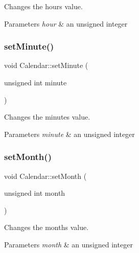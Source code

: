 Changes the hour\textquotesingle{}s value. 


\begin{DoxyParams}{Parameters}
{\em hour} & an unsigned integer \\
\hline
\end{DoxyParams}
\mbox{\label{class_calendar_a94365aea1df3a5085054d61bfa893e41}} 
\subsubsection{\texorpdfstring{set\+Minute()}{setMinute()}}
{\footnotesize\ttfamily void Calendar\+::set\+Minute (\begin{DoxyParamCaption}\item[{unsigned int}]{minute }\end{DoxyParamCaption})}



Changes the minute\textquotesingle{}s value. 


\begin{DoxyParams}{Parameters}
{\em minute} & an unsigned integer \\
\hline
\end{DoxyParams}
\mbox{\label{class_calendar_a66115274b1543b8a393d4cd92195e746}} 
\subsubsection{\texorpdfstring{set\+Month()}{setMonth()}}
{\footnotesize\ttfamily void Calendar\+::set\+Month (\begin{DoxyParamCaption}\item[{unsigned int}]{month }\end{DoxyParamCaption})}



Changes the month\textquotesingle{}s value. 


\begin{DoxyParams}{Parameters}
{\em month} & an unsigned integer \\
\hline
\end{DoxyParams}
\mbox{\label{class_calendar_a22194fd8dcdc4c083f7a870c8a476f75}} 
